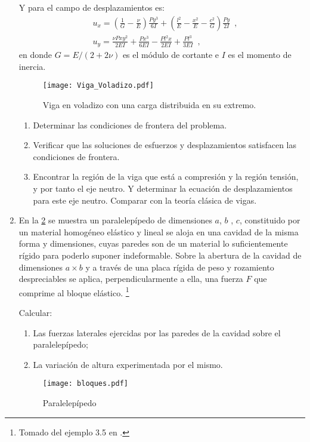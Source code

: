\documentclass[../notas medios.tex]{subfiles}
\begin{document}
\begin{enumerate}
Y para el campo de desplazamientos es:
\begin{align*}
&u_{x} = \left(\frac{1}{G} - \frac{\nu}{E}\right)\frac{Py^3}{6I} + \left(\frac{l^2}{E} - \frac{x^2}{E} - \frac{c^2}{G} \right)\frac{Py}{2I} \enspace ,\\
&u_{y} = \frac{\nu P xy^2}{2EI} + \frac{Px^3}{6EI} - \frac{Pl^2x}{2EI} + \frac{Pl^3}{3EI} \enspace ,
\end{align*}
en donde $G=E/(2 + 2\nu)$ es el módulo de cortante e $I$ es el momento de inercia.
\begin{figure}[h]
	\centering
	\texttt{[image: Viga\_Voladizo.pdf]}
	\caption{Viga en voladizo con una carga distribuida en su extremo.}
	\label{fig:viga}
\end{figure}

\begin{enumerate}
\item Determinar las condiciones de frontera del problema.
\item Verificar que las soluciones de esfuerzos y desplazamientos satisfacen las condiciones de frontera.
\item Encontrar la región de la viga que está a compresión y la región tensión, y por tanto el eje neutro. Y determinar la ecuación de desplazamientos para este eje neutro. Comparar con la teoría clásica de vigas.
\end{enumerate}

\item \label{punto05_m} En la  \cref{bloques} se muestra un paralelepípedo de dimensiones $a$, $b$ , $c$, constituido por un material homogéneo elástico y lineal se aloja en una cavidad de la misma forma y dimensiones, cuyas paredes son de un material lo suficientemente rígido para poderlo suponer indeformable.
Sobre la abertura de la cavidad de dimensiones $a\times b$ y a través de una placa rígida de peso y rozamiento despreciables se aplica, perpendicularmente a ella, una fuerza $F$ que comprime al bloque elástico. \footnote{Tomado del ejemplo 3.5 en \cite{book:problemas_resueltos}.}

Calcular:
\begin{enumerate}
\item Las fuerzas laterales ejercidas por las paredes de la cavidad sobre el paralelepípedo;
\item La variación de altura experimentada por el mismo.
\end{enumerate}

\begin{figure}[h]
	\centering
	\texttt{[image: bloques.pdf]}
	\caption{Paralelepípedo}
	\label{bloques}
\end{figure}


\end{enumerate}
\end{document}
